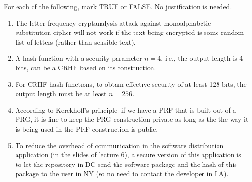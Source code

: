 \documentclass[12pt]{article}
\begin{document}
\newpage
{}
For each of the following, mark TRUE or FALSE. No justification is needed.
\begin{enumerate}
    \item The letter frequency cryptanalysis attack against monoalphabetic substitution cipher will not work if the text being encrypted is some random list of letters (rather than sensible text).
    
    \item A hash function with a security parameter $n = 4$, i.e., the output length is 4 bits, can be a CRHF based on its construction.
    
    \item For CRHF hash functions, to obtain effective security of at least 128 bits, the output length must be at least $n = 256$.
    
    \item According to Kerckhoff's principle, if we have a PRF that is built out of a PRG, it is fine to keep the PRG construction private as long as the the way it is being used in the PRF construction is public.
    
    \item To reduce the overhead of communication in the software distribution application (in the slides of lecture 6), a secure version of this application is to let the repository in DC send the software package and the hash of this package to the user in NY (so no need to contact the developer in LA).
\end{enumerate}
\end{document}
